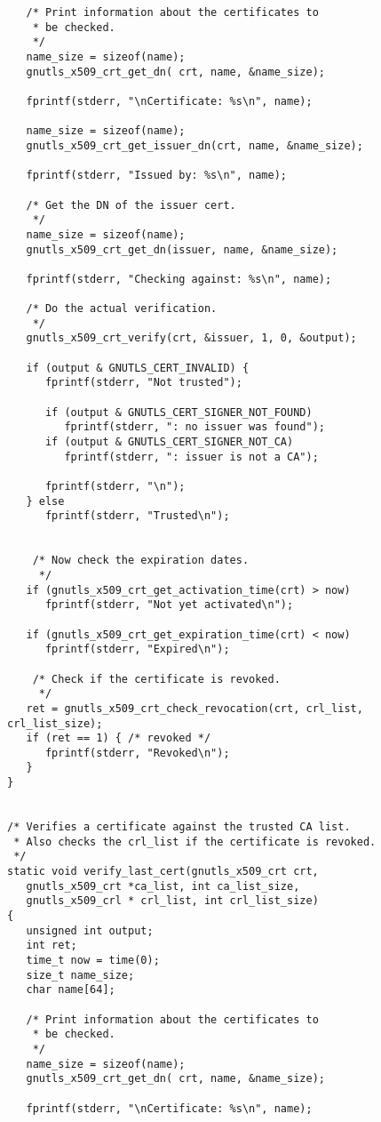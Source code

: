 \begin{verbatim}
   /* Print information about the certificates to
    * be checked.
    */
   name_size = sizeof(name);
   gnutls_x509_crt_get_dn( crt, name, &name_size);

   fprintf(stderr, "\nCertificate: %s\n", name);

   name_size = sizeof(name);
   gnutls_x509_crt_get_issuer_dn(crt, name, &name_size);

   fprintf(stderr, "Issued by: %s\n", name);

   /* Get the DN of the issuer cert.
    */
   name_size = sizeof(name);
   gnutls_x509_crt_get_dn(issuer, name, &name_size);

   fprintf(stderr, "Checking against: %s\n", name);

   /* Do the actual verification.
    */
   gnutls_x509_crt_verify(crt, &issuer, 1, 0, &output);

   if (output & GNUTLS_CERT_INVALID) {
      fprintf(stderr, "Not trusted");

      if (output & GNUTLS_CERT_SIGNER_NOT_FOUND)
         fprintf(stderr, ": no issuer was found");
      if (output & GNUTLS_CERT_SIGNER_NOT_CA)
         fprintf(stderr, ": issuer is not a CA");

      fprintf(stderr, "\n");
   } else
      fprintf(stderr, "Trusted\n");


    /* Now check the expiration dates.
     */
   if (gnutls_x509_crt_get_activation_time(crt) > now)
      fprintf(stderr, "Not yet activated\n");

   if (gnutls_x509_crt_get_expiration_time(crt) < now)
      fprintf(stderr, "Expired\n");

    /* Check if the certificate is revoked.
     */
   ret = gnutls_x509_crt_check_revocation(crt, crl_list, crl_list_size);
   if (ret == 1) { /* revoked */
      fprintf(stderr, "Revoked\n");
   }
}


/* Verifies a certificate against the trusted CA list.
 * Also checks the crl_list if the certificate is revoked.
 */
static void verify_last_cert(gnutls_x509_crt crt,
   gnutls_x509_crt *ca_list, int ca_list_size,
   gnutls_x509_crl * crl_list, int crl_list_size)
{ 
   unsigned int output;
   int ret;
   time_t now = time(0);
   size_t name_size;
   char name[64];

   /* Print information about the certificates to
    * be checked.
    */
   name_size = sizeof(name);
   gnutls_x509_crt_get_dn( crt, name, &name_size);

   fprintf(stderr, "\nCertificate: %s\n", name);


\end{verbatim}
